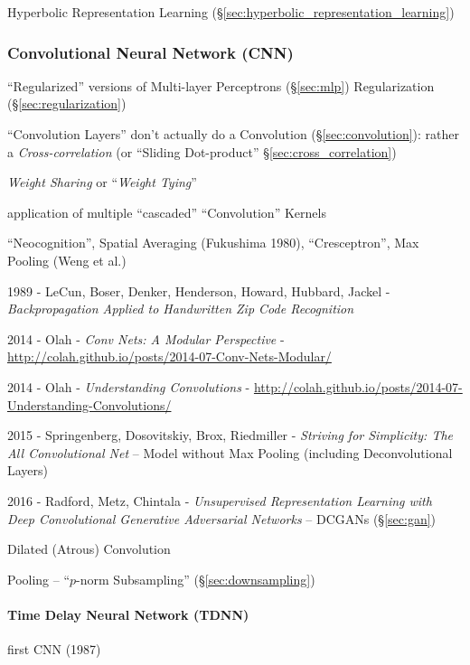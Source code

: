 Hyperbolic Representation Learning
(\S\ref{sec:hyperbolic_representation_learning})



\subsubsection{Convolutional Neural Network (CNN)}\label{sec:cnn}

``Regularized'' versions of Multi-layer Perceptrons (\S\ref{sec:mlp})
\fist Regularization (\S\ref{sec:regularization})

``Convolution Layers'' don't actually do a Convolution
(\S\ref{sec:convolution}):
rather a \emph{Cross-correlation} (or ``Sliding Dot-product''
\S\ref{sec:cross_correlation})

\emph{Weight Sharing} or ``\emph{Weight Tying}''

application of multiple ``cascaded'' ``Convolution'' Kernels

``Neocognition'', Spatial Averaging (Fukushima 1980), ``Cresceptron'', Max
Pooling (Weng et al.)

1989 - LeCun, Boser, Denker, Henderson, Howard, Hubbard, Jackel -
  \emph{Backpropagation Applied to Handwritten Zip Code Recognition}

2014 - Olah - \emph{Conv Nets: A Modular Perspective} -
  \url{http://colah.github.io/posts/2014-07-Conv-Nets-Modular/}

2014 - Olah - \emph{Understanding Convolutions} -
  \url{http://colah.github.io/posts/2014-07-Understanding-Convolutions/}

2015 - Springenberg, Dosovitskiy, Brox, Riedmiller -
\emph{Striving for Simplicity: The All Convolutional Net}
-- Model without Max Pooling (including Deconvolutional Layers)

2016 - Radford, Metz, Chintala - \emph{Unsupervised Representation Learning with
  Deep Convolutional Generative Adversarial Networks} -- DCGANs
(\S\ref{sec:gan})

Dilated (Atrous) Convolution

Pooling -- ``$p$-norm Subsampling'' (\S\ref{sec:downsampling})



\paragraph{Time Delay Neural Network (TDNN)}\label{sec:tdnn}\hfill

first CNN (1987)



